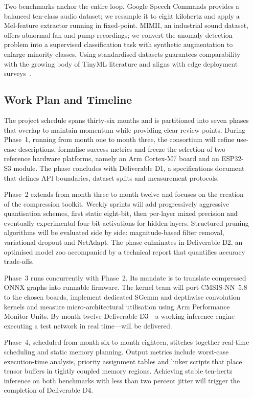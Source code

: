 Two benchmarks anchor the entire loop. Google Speech Commands provides a balanced ten-class audio dataset; we resample it to eight kilohertz and apply a Mel-feature extractor running in fixed-point. MIMII, an industrial sound dataset, offers abnormal fan and pump recordings; we convert the anomaly-detection problem into a supervised classification task with synthetic augmentation to enlarge minority classes. Using standardised datasets guarantees comparability with the growing body of TinyML literature and aligns with edge deployment surveys~\cite{zhang2025survey}.

\subsection{Work Plan and Timeline}
The project schedule spans thirty-six months and is partitioned into seven phases that overlap to maintain momentum while providing clear review points. During Phase~1, running from month one to month three, the consortium will refine use-case descriptions, formalise success metrics and freeze the selection of two reference hardware platforms, namely an Arm Cortex-M7 board and an ESP32-S3 module. The phase concludes with Deliverable D1, a specifications document that defines API boundaries, dataset splits and measurement protocols.

Phase~2 extends from month three to month twelve and focuses on the creation of the compression toolkit. Weekly sprints will add progressively aggressive quantisation schemes, first static eight-bit, then per-layer mixed precision and eventually experimental four-bit activations for hidden layers. Structured pruning algorithms will be evaluated side by side: magnitude-based filter removal, variational dropout and NetAdapt. The phase culminates in Deliverable D2, an optimised model zoo accompanied by a technical report that quantifies accuracy trade-offs.

Phase~3 runs concurrently with Phase~2. Its mandate is to translate compressed ONNX graphs into runnable firmware. The kernel team will port CMSIS-NN~5.8 to the chosen boards, implement dedicated SGemm and depthwise convolution kernels and measure micro-architectural utilisation using Arm Performance Monitor Units. By month twelve Deliverable D3—a working inference engine executing a test network in real time—will be delivered.

Phase~4, scheduled from month six to month eighteen, stitches together real-time scheduling and static memory planning. Output metrics include worst-case execution-time analysis, priority assignment tables and linker scripts that place tensor buffers in tightly coupled memory regions. Achieving stable ten-hertz inference on both benchmarks with less than two percent jitter will trigger the completion of Deliverable D4.


